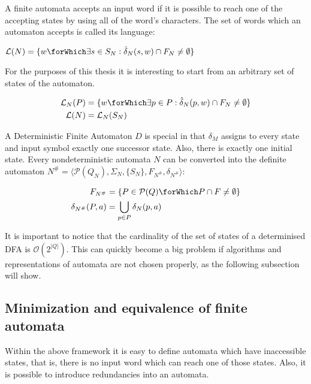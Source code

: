A finite automata accepts an input word if it is possible to reach one of the
accepting states by using all of the word's characters. The set of words which
an automaton accepts is called its language:

\begin{definition}
  $\mathcal{L}(N) = \{ w \forWhich \exists s \in S_N: \hat{\delta}_N(s, w) \cap F_N \neq \emptyset \}$
\end{definition}

For the purposes of this thesis it is interesting to start from an arbitrary set of states of the automaton.

\begin{definition}
  \begin{align*}
    \mathcal{L}_N(P) &= \{ w \forWhich \exists p \in P: \hat{\delta}_N(p, w) \cap F_N \neq \emptyset\}\\
    \mathcal{L}(N) &= \mathcal{L}_N(S_N)
  \end{align*}
\end{definition}

A Deterministic Finite Automaton $D$ is special in that $\delta_M$ assigns to
every state and input symbol exactly one successor state. Also, there is
exactly one initial state.
Every nondeterministic automata $N$ can be converted into the definite automaton
$N^\# = \langle \mathcal{P}(Q_N), \Sigma_N, \{ S_N \}, F_{N^\#}, \delta_{N^\#} \rangle$:

\begin{definition}
  \begin{align*}
    F_{N^\#} &= \{ P \in \mathcal{P}(Q) \forWhich P \cap F \neq \emptyset \}\\
    \delta_{N^\#}(P, a) &= \bigcup_{p \in P} \delta_N(p, a)
  \end{align*}
\end{definition}

It is important to notice that the cardinality of the set of states of a
determinised DFA is $\mathcal{O}(2^{|Q|})$. This can quickly become a big problem
if algorithms and representations of automata are not chosen properly, as the
following subsection will show.

\subsection{Minimization and equivalence of finite automata}

Within the above framework it is easy to define automata which have inaccessible
states, that is, there is no input word which can reach one of those states.
Also, it is possible to introduce redundancies into an automata.

